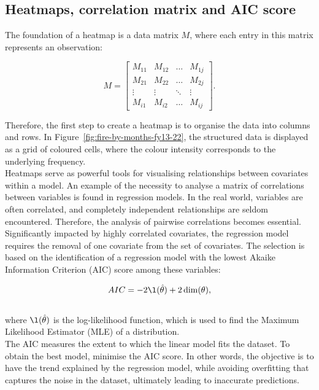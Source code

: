 \documentclass{article}\usepackage[]{graphicx}\usepackage[]{xcolor}
\begin{document}
\subsection{Heatmaps, correlation matrix and AIC score}

The foundation of a heatmap is a data matrix $M$, where each entry in this matrix represents an observation:

$$M =
\left[
\begin{array}{cccc}
    M_{11} & M_{12} & \ldots & M_{1j} \\  
    M_{21} & M_{22} & \ldots & M_{2j} \\  
    \vdots & \vdots & \ddots & \vdots \\  
    M_{i1} & M_{i2} & \ldots & M_{ij}
\end{array}
\right].
$$

\noindent
Therefore, the first step to create a heatmap is to organise the data into columns and rows. In Figure~\ref{fig:fire-by-months-fy13-22}, the structured data is displayed as a grid of coloured cells, where the colour intensity corresponds to the underlying frequency.\\

\noindent
Heatmaps serve as powerful tools for visualising relationships between covariates within a model. An example of the necessity to analyse a matrix of correlations between variables is found in regression models. In the real world, variables are often correlated, and completely independent relationships are seldom encountered. Therefore, the analysis of pairwise correlations becomes essential. Significantly impacted by highly correlated covariates, the regression model requires the removal of one covariate from the set of covariates. The selection is based on the identification of a regression model with the lowest Akaike Information Criterion (AIC) score among these variables: 

$$AIC = -2 \l(\hat{\mathbf{\theta}})+2 \dim (\mathbf{\theta}),$$
\\where $\l(\hat{\mathbf{\theta}})$ is the log-likelihood function, which is used to find the Maximum Likelihood Estimator (MLE) of a distribution.\\

\noindent
The AIC measures the extent to which the linear model fits the dataset. To obtain the best model, minimise the AIC score. In other words, the objective is to have the trend explained by the regression model, while avoiding overfitting that captures the noise in the dataset, ultimately leading to inaccurate predictions.
\end{document}
